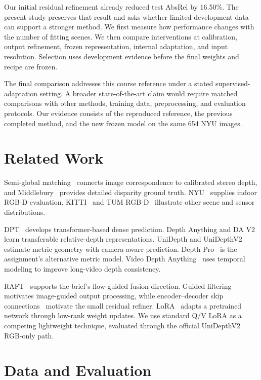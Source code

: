 \documentclass[10pt,twocolumn,letterpaper]{article}
\begin{document}
Our initial residual refinement already reduced test AbsRel by 16.50\%. The present study preserves that result and asks whether limited development data can support a stronger method. We first measure how performance changes with the number of fitting scenes. We then compare interventions at calibration, output refinement, frozen representation, internal adaptation, and input resolution. Selection uses development evidence before the final weights and recipe are frozen.

The final comparison addresses this course reference under a stated supervised-adaptation setting. A broader state-of-the-art claim would require matched comparisons with other methods, training data, preprocessing, and evaluation protocols. Our evidence consists of the reproduced reference, the previous completed method, and the new frozen model on the same 654 NYU images.

\section{Related Work}
Semi-global matching~\cite{hirschmuller2008} connects image correspondence to calibrated stereo depth, and Middlebury~\cite{scharstein2014} provides detailed disparity ground truth. NYU~\cite{silberman2012} supplies indoor RGB-D evaluation. KITTI~\cite{geiger2012} and TUM RGB-D~\cite{sturm2012} illustrate other scene and sensor distributions.

DPT~\cite{ranftl2021} develops transformer-based dense prediction. Depth Anything and DA V2~\cite{yang2024da,yang2024dav2} learn transferable relative-depth representations. UniDepth and UniDepthV2~\cite{piccinelli2024,piccinelli2025} estimate metric geometry with camera-aware prediction. Depth Pro~\cite{bochkovskii2025} is the assignment's alternative metric model. Video Depth Anything~\cite{chen2025} uses temporal modeling to improve long-video depth consistency.

RAFT~\cite{teed2020} supports the brief's flow-guided fusion direction. Guided filtering~\cite{he2010guided} motivates image-guided output processing, while encoder--decoder skip connections~\cite{ronneberger2015unet} motivate the small residual refiner. LoRA~\cite{hu2022lora} adapts a pretrained network through low-rank weight updates. We use standard Q/V LoRA as a competing lightweight technique, evaluated through the official UniDepthV2 RGB-only path.

\section{Data and Evaluation}
\end{document}
